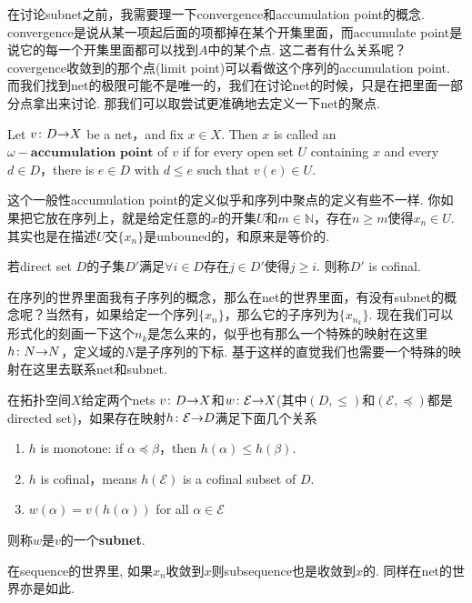 在讨论subnet之前，我需要理一下convergence和accumulation point的概念. convergence是说从某一项起后面的项都掉在某个开集里面，而accumulate point是说它的每一个开集里面都可以找到$A$中的某个点. 这二者有什么关系呢？ covergence收敛到的那个点(limit point)可以看做这个序列的accumulation point. 而我们找到net的极限可能不是唯一的，我们在讨论net的时候，只是在把里面一部分点拿出来讨论. 那我们可以取尝试更准确地去定义一下net的聚点.


\begin{definition}
Let ${v}\colon{D}{\to}{X}$ be a net，and fix $x \in X$. Then $x$ is called an $\omega - \textbf{accumulation point}$ of $v$ if for every open set $U$ containing $x$ and every $d \in D$，there is $e \in D$ with $d \leq e$ such that $v(e) \in U.$
\end{definition}

这个一般性accumulation point的定义似乎和序列中聚点的定义有些不一样. 你如果把它放在序列上，就是给定任意的$x$的开集$U$和$m \in \mathbb{N}$，存在$n \geq m$使得$x_n \in U$. 其实也是在描述$U$交$\{x_n\}$是unbouned的，和原来是等价的. 

\begin{definition}
若direct set $D$的子集$D'$满足$\forall i \in D$存在$j \in D'$使得$j \geq i$. 则称$D'$ is cofinal.
\end{definition}


在序列的世界里面我有子序列的概念，那么在net的世界里面，有没有subnet的概念呢？当然有，如果给定一个序列$\{x_n\}$，那么它的子序列为$\{x_{n_k}\}$. 现在我们可以形式化的刻画一下这个$n_k$是怎么来的，似乎也有那么一个特殊的映射在这里${h}\colon{N}{\to}{N}$，定义域的$N$是子序列的下标. 基于这样的直觉我们也需要一个特殊的映射在这里去联系net和subnet.

\begin{definition}
在拓扑空间$X$给定两个nets ${v}\colon{D}{\to}{X}$和${w}\colon{\mathcal{E}}{\to}{X}$(其中$(D,\leq)$和$(\mathcal{E},\preceq)$都是directed set)，如果存在映射${h}\colon{\mathcal{E}}{\to}{D}$满足下面几个关系
\begin{enumerate}
	\item $h$ is monotone: if $\alpha \preceq \beta$，then $h(\alpha) \leq h(\beta).$
	\item $h$ is cofinal，means $h(\mathcal{E})$ is a cofinal subset of $D$.
	\item $w(\alpha) = v(h(\alpha))$ for all $\alpha \in \mathcal{E}$ 
\end{enumerate}
则称$w$是$v$的一个\textbf{subnet}.
\end{definition}

在sequence的世界里, 如果$x_n$收敛到$x$则subsequence也是收敛到$x$的. 同样在net的世界亦是如此.

